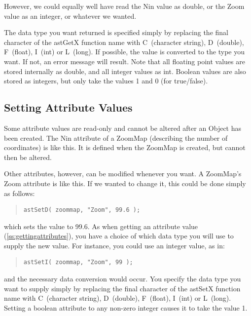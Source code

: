 \documentclass[twoside,11pt]{article}
\newcommand{\htmlref}[2]{#1}
\newcommand{\secref}[1]{\S\ref{#1}}
\renewcommand{\secref}[1]{\ref{#1}}
\begin{document}
However, we could equally well have read the Nin value as double, or
the Zoom value as an integer, or whatever we wanted.

The data type you want returned is specified simply by replacing the
final character of the astGetX function name with C~(character
string), D~(double), F~(float), I~(int) or L~(long). If possible, the
value is converted to the type you want. If not, an error message will
result. Note that all floating point values are stored internally as
double, and all integer values as int. Boolean values are also stored
as integers, but only take the values 1 and 0 (for true/false).

\subsection{\label{ss:settingattributes}Setting Attribute Values}

Some attribute values are read-only and cannot be altered after an
\htmlref{Object}{Object} has been created. The \htmlref{Nin}{Nin} attribute of a \htmlref{ZoomMap}{ZoomMap} (describing
the number of coordinates) is like this. It is defined when the
ZoomMap is created, but cannot then be altered.

Other attributes, however, can be modified whenever you want. A
ZoomMap's \htmlref{Zoom}{Zoom} attribute is like this. If we wanted to change it, this
could be done simply as follows:

\begin{quote}
\small
\begin{verbatim}
astSetD( zoommap, "Zoom", 99.6 );
\end{verbatim}
\normalsize
\end{quote}

which sets the value to 99.6. As when getting an attribute value
(\secref{ss:gettingattributes}), you have a choice of which data type
you will use to supply the new value. For instance, you could use an
integer value, as in:

\begin{quote}
\small
\begin{verbatim}
astSetI( zoommap, "Zoom", 99 );
\end{verbatim}
\normalsize
\end{quote}

and the necessary data conversion would occur.  You specify the data
type you want to supply simply by replacing the final character of the
astSetX function name with C~(character string), D~(double),
F~(float), I~(int) or L~(long). Setting a boolean attribute to any
non-zero integer causes it to take the value 1.
\end{document}
